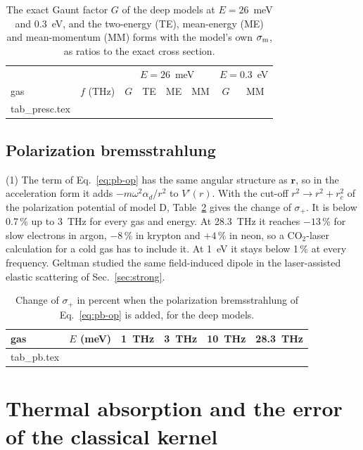 \documentclass[11pt]{article}
\makeatletter
\numberwithin{equation}{section}
\newcommand{\tabinput}[1]{\@@input #1 }
\newcommand{\rv}{\mathbf r}
\newcommand{\sm}{\sigma_{\rm m}}
\makeatother
\begin{document}
\begin{table}[ht]
\caption{The exact Gaunt factor $G$ of the deep models at $E=26$~meV and
0.3~eV, and the two-energy (TE), mean-energy (ME) and mean-momentum (MM) forms
with the model's own $\sm$, as ratios to the exact cross section.}
\label{tab:presc}
\begin{center}
\begin{tabular}{lccccccc}
\toprule
 & & \multicolumn{4}{c}{$E=26$~meV} & \multicolumn{2}{c}{$E=0.3$~eV}\\
gas & $f$ (THz) & $G$ & TE & ME & MM & $G$ & MM\\
\midrule
\tabinput{tab_presc.tex}
\bottomrule
\end{tabular}
\end{center}
\end{table}

\subsection{Polarization bremsstrahlung}
\label{sec:pbnum}
{\noindent}(1) The term of Eq.~\eqref{eq:pb-op} has the same angular structure
as $\rv$, so in the acceleration form it adds $-m\omega^2\alpha_d/r^2$ to
$V'(r)$. With the cut-off $r^2\to r^2+r_c^2$ of the polarization potential of
model D, Table~\ref{tab:pb} gives the change of $\sigma_+$. It is below 0.7\,\%
up to 3~THz for every gas and energy. At 28.3~THz it reaches $-13$\,\% for slow
electrons in argon, $-8$\,\% in krypton and $+4$\,\% in neon, so a CO$_2$-laser
calculation for a cold gas has to include it. At 1~eV it stays below 1\,\% at
every frequency. Geltman \cite{Geltman1995} studied the same field-induced
dipole in the laser-assisted elastic scattering of Sec.~\ref{sec:strong}.

\begin{table}[ht]
\caption{Change of $\sigma_+$ in percent when the polarization bremsstrahlung
of Eq.~\eqref{eq:pb-op} is added, for the deep models.}
\label{tab:pb}
\begin{center}
\begin{tabular}{lccccc}
\toprule
gas & $E$ (meV) & 1~THz & 3~THz & 10~THz & 28.3~THz\\
\midrule
\tabinput{tab_pb.tex}
\bottomrule
\end{tabular}
\end{center}
\end{table}

\section{Thermal absorption and the error of the classical kernel}
\label{sec:thermal}
\end{document}
